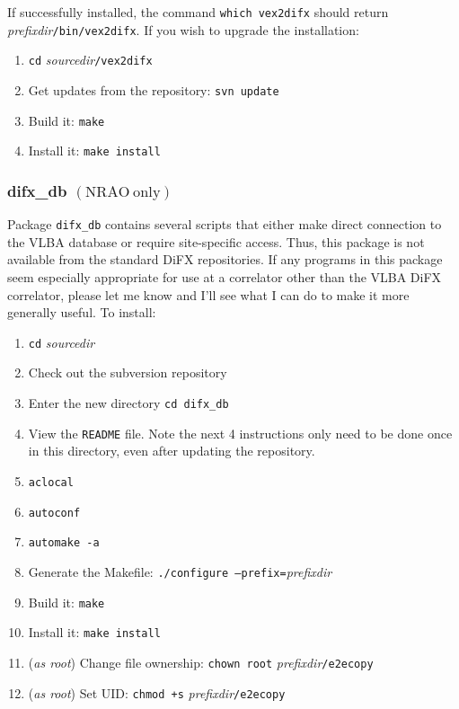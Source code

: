 If successfully installed, the command {\tt which vex2difx} should return {\em prefixdir}{\tt /bin/vex2difx}.
If you wish to upgrade the installation:
\begin{enumerate}
\item {\tt cd} {\em sourcedir}{\tt /vex2difx}
\item Get updates from the repository: {\tt svn update}
\item Build it: {\tt make}
\item Install it: {\tt make install}
\end{enumerate}










\subsubsection{difx\_db {\small $\mathrm{(NRAO\ only)}$}}

Package {\tt difx\_db} contains several scripts that either make direct connection to the VLBA database or require site-specific access.
Thus, this package is not available from the standard DiFX repositories.
If any programs in this package seem especially appropriate for use at a correlator other than the VLBA DiFX correlator, please let me know and I'll see what I can do to make it more generally useful.
To install:
\begin{enumerate}
\item {\tt cd} {\em sourcedir}
\item Check out the subversion repository
\item Enter the new directory {\tt cd difx\_db}
\item View the {\tt README} file.  
Note the next 4 instructions only need to be done once in this directory, even after updating the repository.
\item {\tt aclocal}
\item {\tt autoconf}
\item {\tt automake -a}
\item Generate the Makefile: {\tt ./configure --prefix=}{\em prefixdir}
\item Build it: {\tt make}
\item Install it: {\tt make install}
\item ({\em as root}) Change file ownership: {\tt chown root} {\em prefixdir}{\tt /e2ecopy}
\item ({\em as root}) Set UID: {\tt chmod +s} {\em prefixdir}{\tt /e2ecopy}
\end{enumerate}

